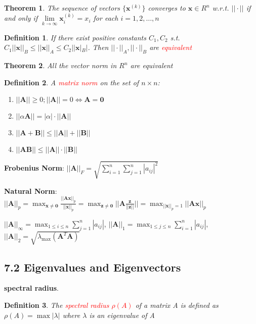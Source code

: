 \documentclass[11pt]{article}
\newtheorem{theorem}{Theorem}[section]
\newtheorem{definition}{Definition}[section]
\begin{document}
\begin{theorem}
The sequence of vectors $\{\mathbf{x}^{(k)}\}$ converges to $ \mathbf{x}\in R^n$
w.r.t. $||\cdot||$ if and only if $ \lim\limits_{k\to\infty}\mathbf{x}^{(k)}_i=x_i$
for each $i=1,2,\dots,n$
\end{theorem}

\begin{definition}
If there exist positive constants $C_1,C_2$ s.t. $C_1||\mathbf{x}||_B\le||\mathbf{x}||_A
\le C_2||\mathbf{x}|_B|$. Then $||\cdot||_A,||\cdot||_B$ are \textcolor{red}{equivalent} 
\end{definition}

\begin{theorem}
All the vector norm in $R^n$ are equivalent
\end{theorem}


\begin{definition}
A \textcolor{red}{matrix norm} on the set of $n\times n$:
\begin{enumerate}
\item $||\mathbf{A}||\ge0;||\mathbf{A}||=0\Longleftrightarrow \mathbf{A}=\mathbf{0}$
\item $||\alpha \mathbf{A}||=|\alpha|\cdot||\mathbf{A}||$
\item $||\mathbf{A}+\mathbf{B}||\le||\mathbf{A}||+||\mathbf{B}||$
\item $||\mathbf{AB}||\le||\mathbf{A}||\cdot||\mathbf{B}||$
\end{enumerate}
\end{definition}

\textbf{Frobenius Norm}: \(||\mathbf{A}||_F=\sqrt{\displaystyle\sum_{i=1}^n
   \displaystyle\sum_{j=1}^n|a_{ij}|^2}\)

\textbf{Natural Norm}: \(||\mathbf{A}||_p=\displaystyle\max_{\mathbf{x}\neq
   \mathbf{0}}\frac{||\mathbf{Ax}||_p}{||\mathbf{x}||_p}=\displaystyle\max_{\mathbf{z}\neq
   \mathbf{0}}||\mathbf{A}\frac{\mathbf{z}}{||\mathbf{z}||}||=\displaystyle\max_{||\mathbf{x}||_p=1}||\mathbf{Ax}||_p\)

\(||\mathbf{A}||_\infty=\displaystyle\max_{1\le i\le n}\displaystyle\sum_{j=1}^n|a_{ij}|\),
\(||\mathbf{A}||_1=\displaystyle\max_{1\le j\le n}\displaystyle\sum_{i=1}^n|a_{ij}|\),
\(||\mathbf{A}||_2=\sqrt{\lambda_\text{max}(\mathbf{A}^T \mathbf{A})}\)
\subsection{7.2 Eigenvalues and Eigenvectors}
\label{sec:org827c3be}
\textbf{spectral radius}.
\begin{definition}
The \textcolor{red}{spectral radius $\rho(A)$} of a matrix A is defined as
$\rho(A)=\max|\lambda|$ where $\lambda$ is an eigenvalue of A
\end{definition}
\end{document}
